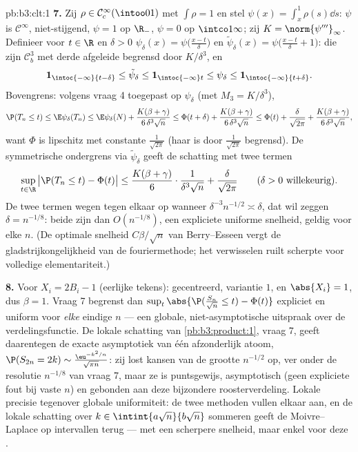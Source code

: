 \begin{solution}{pb:b3:clt:1}
\textbf{7.} Zij $\rho \in \mathcal C^\infty_c(\intoo01)$
met $\int\rho = 1$ en stel $\psi(x) = \int_x^1\rho(s)\dd
s$: $\psi$ is $\mathcal C^\infty$, niet-stijgend, $\psi = 1$
op $\R_-$, $\psi = 0$ op $\intco1\infty$; zij $K =
\norm{\psi'''}_\infty$. Definieer voor $t \in \R$ en $\delta
> 0$ $\psi_\delta(x) = \psi\bigl(\frac{x - t}\delta\bigr)$
en $\tilde\psi_\delta(x) = \psi\bigl(\frac{x - t}\delta +
1\bigr)$: die zijn $\mathcal C^3_b$ met derde afgeleide
begrensd door $K/\delta^3$, en
\[
\mathbf 1_{\intoc{-\infty}{t-\delta}} \leq
\tilde\psi_\delta \leq \mathbf 1_{\intoc{-\infty}t} \leq
\psi_\delta \leq \mathbf 1_{\intoc{-\infty}{t+\delta}} .
\]
Bovengrens: volgens vraag 4 toegepast op $\psi_\delta$ (met
$M_3 = K/\delta^3$),
\[
\P(T_n \leq t) \leq \E\psi_\delta(T_n) \leq
\E\psi_\delta(N) + \frac{K(\beta +
\gamma)}{6\,\delta^3\sqrt n}
\leq \Phi(t + \delta) + \frac{K(\beta +
\gamma)}{6\,\delta^3\sqrt n}
\leq \Phi(t) + \frac{\delta}{\sqrt{2\pi}} +
\frac{K(\beta + \gamma)}{6\,\delta^3\sqrt n},
\]
want $\Phi$ is lipschitz met constante
$\frac1{\sqrt{2\pi}}$ (haar  is door
$\frac1{\sqrt{2\pi}}$ begrensd). De symmetrische
ondergrens via $\tilde\psi_\delta$ geeft de schatting met
twee termen
\[
\sup_{t\in\R}\,\bigl|\P(T_n \leq t) - \Phi(t)\bigr| \leq
\frac{K(\beta + \gamma)}{6}\cdot\frac{1}{\delta^3\sqrt n} +
\frac{\delta}{\sqrt{2\pi}}
\qquad(\delta > 0\ \text{willekeurig}).
\]
De twee termen wegen tegen elkaar op wanneer
$\delta^{-3}n^{-1/2} \asymp \delta$, dat wil zeggen $\delta
= n^{-1/8}$: beide zijn dan $O(n^{-1/8})$, een expliciete
uniforme snelheid, geldig voor elke $n$. (De optimale
snelheid $C\beta/\sqrt n$ van Berry--Esseen vergt de
gladstrijkongelijkheid van de fouriermethode; het
verwisselen ruilt scherpte voor volledige elementariteit.)

\textbf{8.} Voor $X_i = 2B_i - 1$ (eerlijke tekens):
gecentreerd, variantie $1$, en $\abs{X_i} = 1$, dus $\beta =
1$. Vraag 7 begrenst dan
$\sup_t\abs{\P(\frac{S_n}{\sqrt n} \leq t) - \Phi(t)}$
expliciet en uniform voor \emph{elke} eindige $n$ --- een
globale, niet-asymptotische uitspraak over de
verdelingsfunctie. De lokale schatting van
\cref{pb:b3:product:1}, vraag 7, geeft daarentegen de
exacte asymptotiek van één afzonderlijk atoom,
$\P(S_{2n} = 2k) \sim \frac{\eu^{-k^2/n}}{\sqrt{\pi n}}$:
zij lost kansen van de grootte $n^{-1/2}$ op, ver onder de
resolutie $n^{-1/8}$ van vraag 7, maar ze is puntsgewijs,
asymptotisch (geen expliciete fout bij vaste $n$) en
gebonden aan deze bijzondere roosterverdeling. Lokale
precisie tegenover globale uniformiteit: de twee methoden
vullen elkaar aan, en de lokale schatting over $k \in
\intint{a\sqrt n}{b\sqrt n}$ sommeren geeft de Moivre--Laplace
op intervallen terug --- met een scherpere snelheid, maar
enkel voor deze .


\end{solution}
